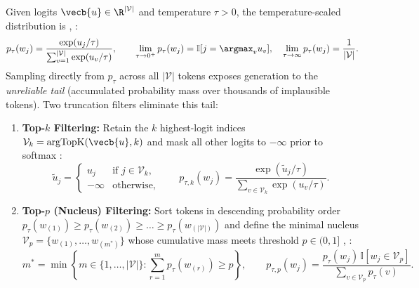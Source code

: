 \documentclass[../../../../master.tex]{subfiles}
\begin{document}
\begin{coremath}
Given logits $\vecb{u} \in \R^{|\mathcal{V}|}$ and temperature $\tau > 0$, the temperature-scaled distribution is , :
\begin{equation}\label{eq:decode:temperature_softmax}
  p_{\tau}(w_j) = \frac{\exp(u_j / \tau)}{\sum_{v=1}^{|\mathcal{V}|} \exp(u_v / \tau)}, \qquad
  \lim_{\tau \to 0^+} p_{\tau}(w_j) = \mathbb{I}[j = \argmax_v u_v], \quad
  \lim_{\tau \to \infty} p_{\tau}(w_j) = \frac{1}{|\mathcal{V}|}.
\end{equation}
Sampling directly from $p_{\tau}$ across all $|\mathcal{V}|$ tokens exposes generation to the \emph{unreliable tail} (accumulated probability mass over thousands of implausible tokens). Two truncation filters eliminate this tail:
\begin{enumerate}
  \item \textbf{Top-$k$ Filtering:} Retain the $k$ highest-logit indices $\mathcal{V}_k = \mathrm{argTopK}(\vecb{u}, k)$ and mask all other logits to $-\infty$ prior to softmax :
  \begin{equation}\label{eq:decode:topk}
    \tilde{u}_j = \begin{cases} u_j & \text{if } j \in \mathcal{V}_k, \\ -\infty & \text{otherwise}, \end{cases}
    \qquad p_{\tau, k}(w_j) = \frac{\exp(\tilde{u}_j / \tau)}{\sum_{v \in \mathcal{V}_k} \exp(u_v / \tau)}.
  \end{equation}
  \item \textbf{Top-$p$ (Nucleus) Filtering:} Sort tokens in descending probability order $p_{\tau}(w_{(1)}) \ge p_{\tau}(w_{(2)}) \ge \dots \ge p_{\tau}(w_{(|\mathcal{V}|)})$ and define the minimal nucleus $\mathcal{V}_p = \{w_{(1)}, \dots, w_{(m^*)}\}$ whose cumulative mass meets threshold $p \in (0, 1]$ , :
  \begin{equation}\label{eq:decode:topp}
    m^* = \min \left\{ m \in \{1, \dots, |\mathcal{V}|\} : \sum_{r=1}^{m} p_{\tau}(w_{(r)}) \ge p \right\},
    \qquad p_{\tau, p}(w_j) = \frac{p_{\tau}(w_j)\,\mathbb{I}[w_j \in \mathcal{V}_p]}{\sum_{v \in \mathcal{V}_p} p_{\tau}(v)}.
  \end{equation}
\end{enumerate}
\end{coremath}
\end{document}
